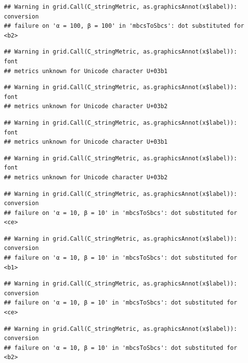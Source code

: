 \documentclass[]{book}
\theoremstyle{definition}
\theoremstyle{definition}
\theoremstyle{definition}
\theoremstyle{remark}
\begin{document}
\begin{verbatim}
## Warning in grid.Call(C_stringMetric, as.graphicsAnnot(x$label)): conversion
## failure on 'α = 100, β = 100' in 'mbcsToSbcs': dot substituted for <b2>
\end{verbatim}

\begin{verbatim}
## Warning in grid.Call(C_stringMetric, as.graphicsAnnot(x$label)): font
## metrics unknown for Unicode character U+03b1
\end{verbatim}

\begin{verbatim}
## Warning in grid.Call(C_stringMetric, as.graphicsAnnot(x$label)): font
## metrics unknown for Unicode character U+03b2
\end{verbatim}

\begin{verbatim}
## Warning in grid.Call(C_stringMetric, as.graphicsAnnot(x$label)): font
## metrics unknown for Unicode character U+03b1
\end{verbatim}

\begin{verbatim}
## Warning in grid.Call(C_stringMetric, as.graphicsAnnot(x$label)): font
## metrics unknown for Unicode character U+03b2
\end{verbatim}

\begin{verbatim}
## Warning in grid.Call(C_stringMetric, as.graphicsAnnot(x$label)): conversion
## failure on 'α = 10, β = 10' in 'mbcsToSbcs': dot substituted for <ce>
\end{verbatim}

\begin{verbatim}
## Warning in grid.Call(C_stringMetric, as.graphicsAnnot(x$label)): conversion
## failure on 'α = 10, β = 10' in 'mbcsToSbcs': dot substituted for <b1>
\end{verbatim}

\begin{verbatim}
## Warning in grid.Call(C_stringMetric, as.graphicsAnnot(x$label)): conversion
## failure on 'α = 10, β = 10' in 'mbcsToSbcs': dot substituted for <ce>
\end{verbatim}

\begin{verbatim}
## Warning in grid.Call(C_stringMetric, as.graphicsAnnot(x$label)): conversion
## failure on 'α = 10, β = 10' in 'mbcsToSbcs': dot substituted for <b2>
\end{verbatim}
\end{document}

